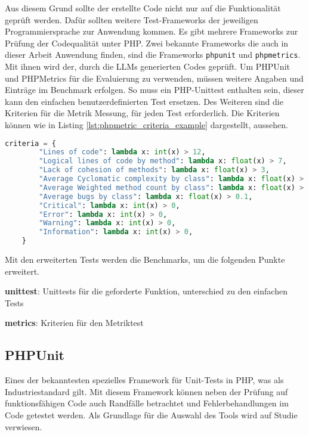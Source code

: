 Aus diesem Grund sollte der erstellte Code nicht nur auf die Funktionalität geprüft werden. Dafür sollten weitere Test-Frameworks der jeweiligen Programmiersprache zur Anwendung kommen. Es gibt mehrere Frameworks zur Prüfung der Codequalität unter PHP. Zwei bekannte Frameworks die auch in dieser Arbeit Anwendung finden, sind die Frameworks \texttt{phpunit} und \texttt{phpmetrics}. Mit ihnen wird der, durch die LLMs generierten Codes geprüft.\vspace{0.2cm}
Um PHPUnit und PHPMetrics für die Evaluierung zu verwenden, müssen weitere Angaben und Einträge im Benchmark erfolgen. So muss ein PHP-Unittest enthalten sein, dieser kann den einfachen benutzerdefinierten Test ersetzen. Des Weiteren sind die Kriterien für die Metrik Messung, für jeden Test erforderlich. Die Kriterien können wie in Listing \ref{lst:phpmetric_criteria_example} dargestellt, aussehen.

\begin{lstlisting}[language=python,caption={Beispiel für Bewertungskriterien},label=lst:phpmetric_criteria_example]
	criteria = {
		"Lines of code": lambda x: int(x) > 12,
		"Logical lines of code by method": lambda x: float(x) > 7,
		"Lack of cohesion of methods": lambda x: float(x) > 3,
		"Average Cyclomatic complexity by class": lambda x: float(x) > 10,
		"Average Weighted method count by class": lambda x: float(x) > 20,
		"Average bugs by class": lambda x: float(x) > 0.1,
		"Critical": lambda x: int(x) > 0,
		"Error": lambda x: int(x) > 0,
		"Warning": lambda x: int(x) > 0,
		"Information": lambda x: int(x) > 0,
	}
\end{lstlisting}

Mit den erweiterten Tests werden die Benchmarks, um die folgenden Punkte erweitert.

\begin{myitemize}
	\item \textbf{unittest}: Unittests für die geforderte Funktion, unterschied zu den einfachen Tests
	\item \textbf{metrics}: Kriterien für den Metriktest
\end{myitemize}

\subsection{PHPUnit}
Eines der bekanntesten spezielles Framework für Unit-Tests in PHP, was als Industriestandard gilt. Mit diesem Framework können neben der Prüfung auf funktionsfähigen Code auch Randfälle betrachtet und Fehlerbehandlungen im Code getestet werden. Als Grundlage für die Auswahl des Tools wird auf Studie \cite{mohamad-2016} verwiesen.

